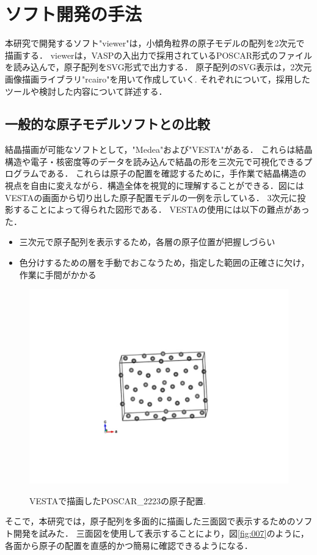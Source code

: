 
\section{ソフト開発の手法}
本研究で開発するソフト"viewer"は，小傾角粒界の原子モデルの配列を2次元で描画する．
viewerは，VASPの入出力で採用されているPOSCAR形式のファイルを読み込んで，原子配列をSVG形式で出力する．
原子配列のSVG表示は，2次元画像描画ライブラリ"rcairo"を用いて作成していく.
それぞれについて，採用したツールや検討した内容について詳述する．

\subsection{一般的な原子モデルソフトとの比較}
結晶描画が可能なソフトとして，"Medea"および"VESTA"がある．
これらは結晶構造や電子・核密度等のデータを読み込んで結晶の形を三次元で可視化できるプログラムである\cite{Vesta}．
これらは原子の配置を確認するために，手作業で結晶構造の視点を自由に変えながら．構造全体を視覚的に理解することができる．図にはVESTAの画面から切り出した原子配置モデルの一例を示している．
3次元に投影することによって得られた図形である．
VESTAの使用には以下の難点があった．

\begin{itemize}
\item 三次元で原子配列を表示するため，各層の原子位置が把握しづらい
\item 色分けするための層を手動でおこなうため，指定した範囲の正確さに欠け，作業に手間がかかる
\end{itemize}
\begin{figure}[htbp]\begin{center}
\includegraphics[width=12cm,bb= 0 0 937 753]{../figs/./boundary_narita.006.jpeg}
\caption{VESTAで描画したPOSCAR\_2223の原子配置.}
\label{fig:006}
\label{default}\end{center}\end{figure}
そこで，本研究では，原子配列を多面的に描画した三面図で表示するためのソフト開発を試みた．
三面図を使用して表示することにより，図\ref{fig:007}のように，各面から原子の配置を直感的かつ簡易に確認できるようになる．

